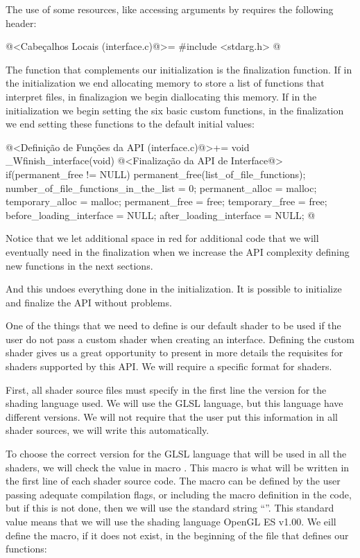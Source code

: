 The use of some resources, like accessing arguments by
 requires the following header:

\iniciocodigo
@<Cabeçalhos Locais (interface.c)@>=
#include <stdarg.h>
@
\fimcodigo


The function that complements our initialization is the finalization
function. If in the initialization we end allocating memory to store a
list of functions that interpret files, in finalizagion we begin
diallocating this memory. If in the initialization we begin setting
the six basic custom functions, in the finalization we end setting
these functions to the default initial values:

\iniciocodigo
@<Definição de Funções da API (interface.c)@>+=
void _Wfinish_interface(void){
  @<Finalização da API de Interface@>
  if(permanent_free != NULL)
    permanent_free(list_of_file_functions);
  number_of_file_functions_in_the_list = 0;
  permanent_alloc = malloc;
  temporary_alloc = malloc;
  permanent_free = free;
  temporary_free = free;
  before_loading_interface = NULL;
  after_loading_interface = NULL;
}
@
\fimcodigo

Notice that we let additional space in red for additional code that we
will eventually need in the finalization when we increase the API
complexity defining new functions in the next sections.

And this undoes everything done in the initialization. It is possible
to initialize and finalize the API without problems.


One of the things that we need to define is our default shader to be
used if the user do not pass a custom shader when creating an
interface. Defining the custom shader gives us a great opportunity to
present in more details the requisites for shaders supported by this
API. We will require a specific format for shaders.

First, all shader source files must specify in the first line the
version for the shading language used. We will use the GLSL language,
but this language have different versions. We will not require that
the user put this information in all shader sources, we will write
this automatically.

To choose the correct version for the GLSL language that will be used
in all the shaders, we will check the value in macro
. This macro is what will be written in
the first line of each shader source code. The macro can be defined by
the user passing adequate compilation flags, or including the macro
definition in the code, but if this is not done, then we will use the
standard string ``''. This standard value
means that we will use the shading language OpenGL ES v1.00. We eill
define the macro, if it does not exist, in the beginning of the file
that defines our functions:

